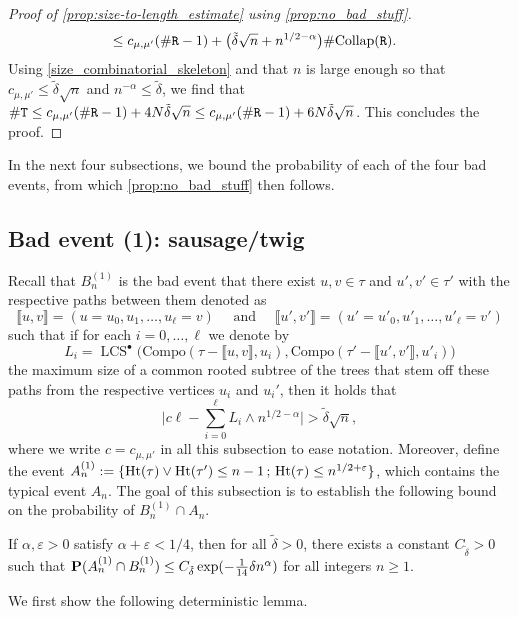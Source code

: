 \documentclass[11pt,reqno]{amsart}
\newcommand{\Ht}{\mathrm{Ht}}
\newcommand{\LCS}{\operatorname{LCS}}
\begin{document}
\begin{proof}[Proof of \cref{prop:size-to-length_estimate} using \cref{prop:no_bad_stuff}]
\begin{align*}
&\leq c_{\mu,\mu'}(\#\mathtt{R}-1) +\big(\tilde{\delta}\sqrt{n}+n^{1/2-\alpha}\big)\#\mathrm{Collap}(\mathtt{R}).
\end{align*}
Using \eqref{size_combinatorial_skeleton} and that $n$ is large enough so that $c_{\mu,\mu'}\leq \tilde{\delta}\sqrt{n}$ and $n^{-\alpha}\leq \tilde{\delta}$, we find that $\#\mathtt{T}\leq c_{\mu,\mu'}(\#\mathtt{R}-1)+4N\tilde{\delta}\sqrt{n}\leq c_{\mu,\mu'}(\#\mathtt{R}-1)+6N\tilde{\delta}\sqrt{n}$. This concludes the proof.
\end{proof}

In the next four subsections, we bound the probability of each of the four bad events, from which \cref{prop:no_bad_stuff} then follows. 


\subsection{Bad event (1): sausage/twig}
Recall that $B_n^{(1)}$ is the bad event that there exist $u,v\in \tau$ and $u',v'\in\tau'$ with the respective paths between them denoted as
\[\llbracket u,v\rrbracket=(u=u_0,u_1,\dots, u_\ell=v)\quad\text{ and }\quad\llbracket u',v'\rrbracket=(u'=u'_0,u'_1,\dots, u'_\ell=v')\]
such that if for each $i=0,\dots,\ell$ we denote by
\[L_i=\LCS^\bullet\big(\mathrm{Compo}(\tau-\llbracket u,v \rrbracket, u_i),\mathrm{Compo}(\tau'-\llbracket u',v' \rrbracket, u'_i)\big)\]
the maximum size of a common rooted subtree of the trees that stem off these paths from the respective vertices $u_i$ and $u_i'$, then it holds that 
\[\bigg|c\ell-\sum_{i=0}^{\ell} L_i\wedge n^{1/2-\alpha}\bigg|> \tilde{\delta} \sqrt{n},\]
where we write $c=c_{\mu,\mu'}$ in all this subsection to ease notation. Moreover, define the event $A_n^{(1)}:=\{\Ht(\tau) \vee \Ht(\tau') \leq n-1 \,;\, \Ht(\tau) \leq n^{1/2+\e}\}$, which contains the typical event $A_n$. The goal of this subsection is to establish the following bound on the probability of $B_n^{(1)}\cap A_n$. 

\begin{prop}
\label{prop:no_sausages}
    If $\alpha,\varepsilon>0$ satisfy $\alpha+\varepsilon<1/4$, then for all $\tilde\delta>0$, there exists a constant $C_{\tilde\delta}>0$ such that $\mathbf{P}(A_n^{(1)}\cap B^{(1)}_n)\le C_{\tilde\delta}\exp(-\tfrac{1}{14}\delta n^{\alpha})$ for all integers $n\geq 1$.
\end{prop} 
    
We first show the following deterministic lemma. 
\end{document}
